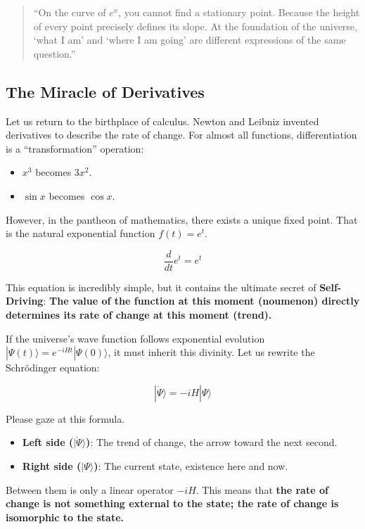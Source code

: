\documentclass[11pt,a4paper,twoside]{book}
\begin{document}
\begin{quote}
``On the curve of $e^x$, you cannot find a stationary point. Because the height of every point precisely defines its slope. At the foundation of the universe, `what I am' and `where I am going' are different expressions of the same question.''
\end{quote}

\subsection{The Miracle of Derivatives}

Let us return to the birthplace of calculus. Newton and Leibniz invented derivatives to describe the rate of change. For almost all functions, differentiation is a ``transformation'' operation:

\begin{itemize}
\item $x^3$ becomes $3x^2$.

\item $\sin x$ becomes $\cos x$.
\end{itemize}

However, in the pantheon of mathematics, there exists a unique fixed point. That is the natural exponential function $f(t) = e^t$.

$$\frac{d}{dt} e^t = e^t$$

This equation is incredibly simple, but it contains the ultimate secret of \textbf{Self-Driving}: \textbf{The value of the function at this moment (noumenon) directly determines its rate of change at this moment (trend).}

If the universe's wave function follows exponential evolution $|\Psi(t)\rangle = e^{-iHt} |\Psi(0)\rangle$, it must inherit this divinity. Let us rewrite the Schrödinger equation:

$$|\dot{\Psi}\rangle = -iH |\Psi\rangle$$

Please gaze at this formula.

\begin{itemize}
\item \textbf{Left side ($|\dot{\Psi}\rangle$)}: The trend of change, the arrow toward the next second.

\item \textbf{Right side ($|\Psi\rangle$)}: The current state, existence here and now.
\end{itemize}

Between them is only a linear operator $-iH$. This means that \textbf{the rate of change is not something external to the state; the rate of change is isomorphic to the state.}
\end{document}
